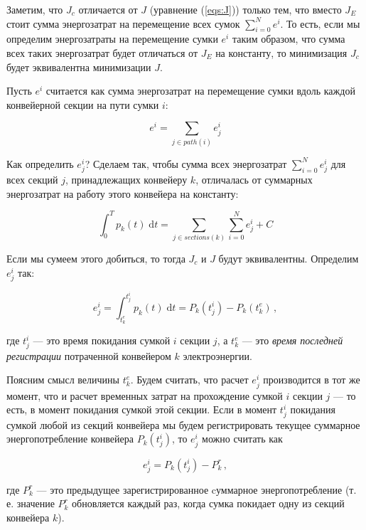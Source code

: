 \documentclass[specification,annotation,times]{itmo-student-thesis}
\theoremstyle{definition}
\begin{document}
Заметим, что $J_c$ отличается от $J$ (уравнение (\ref{eqs:J})) только тем, что
вместо $J_E$ стоит сумма энергозатрат на перемещение всех сумок
$\sum\limits_{i=0}^{N} e^i$. То есть, если мы определим энергозатраты на
перемещение сумки $e^i$ таким образом, что сумма всех таких энергозатрат будет
отличаться от $J_E$ на константу, то минимизация $J_c$ будет эквивалентна
минимизации $J$.

Пусть $e^i$ считается как сумма энергозатрат на перемещение сумки вдоль каждой
конвейерной секции на пути сумки $i$:

\begin{equation}
  e^i = \sum\limits_{j \in path(i)} e_j^i
\end{equation}

Как определить $e_j^i$? Сделаем так, чтобы сумма всех энергозатрат
$\sum\limits_{i=0}^N e_j^i$ для всех секций $j$, принадлежащих конвейеру $k$,
отличалась от суммарных энергозатрат на работу этого конвейера на константу:

\begin{equation}\label{eqs:some-equality}
  \int_0^T \! p_k(t) \; \mathrm{d}t = \sum\limits_{j \in sections(k)} \sum\limits_{i=0}^N e_j^i + C
\end{equation}

Если мы сумеем этого добиться, то тогда $J_c$ и $J$ будут эквивалентны.
Определим $e_j^i$ так:

\begin{equation}
  e_j^i = \int_{t_k^e}^{t_j^i} \! p_k(t) \; \mathrm{d}t = P_k(t_j^i) -
  P_k(t_k^e) \,,
\end{equation}

где $t_j^i$ --- это время покидания сумкой $i$ секции $j$, а $t_k^e$ ---
это \textit{время последней регистрации} потраченной конвейером $k$
электроэнергии.

Поясним смысл величины $t_k^e$. Будем считать, что расчет $e_j^i$ производится в
тот же момент, что и расчет временных затрат на прохождение сумкой $i$ секции
$j$ --- то есть, в момент покидания сумкой этой секции. Если в момент $t_j^i$
покидания сумкой любой из секций конвейера мы будем регистрировать текущее
суммарное энергопотребление конвейера $P_k(t_j^i)$, то $e_j^i$ можно считать как

\begin{equation}
  e_j^i = P_k(t_j^i) - P_k^r \,,
\end{equation}

где $P_k^r$ --- это предыдущее зарегистрированное cуммарное энергопотребление
(т. е. значение $P_k^r$ обновляется каждый раз, когда сумка покидает одну из
секций конвейера $k$).
\end{document}
